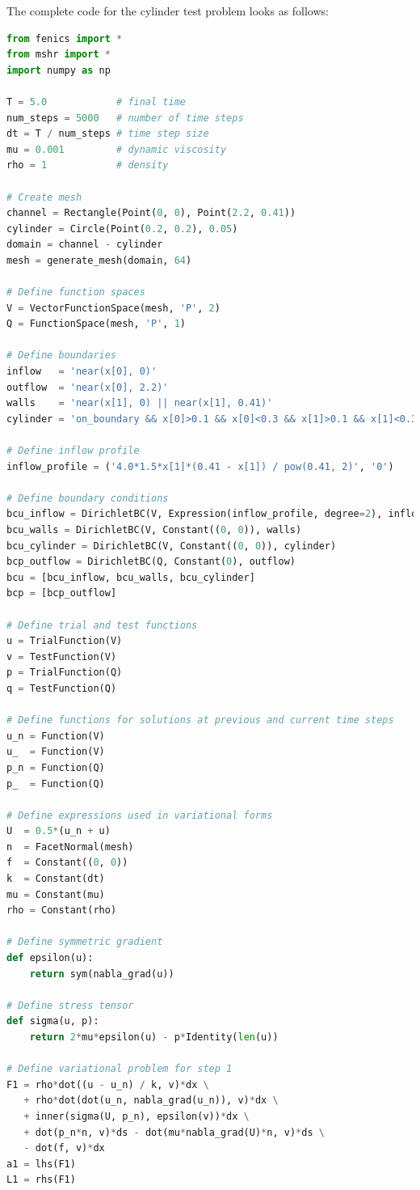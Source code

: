 \documentclass[graybox,envcountchap,sectrefs,final]{svmonodo}
\begin{document}
The complete code for the cylinder test problem looks as
follows:

\begin{lstlisting}[language=Python,style=graycolor]
from fenics import *
from mshr import *
import numpy as np

T = 5.0            # final time
num_steps = 5000   # number of time steps
dt = T / num_steps # time step size
mu = 0.001         # dynamic viscosity
rho = 1            # density

# Create mesh
channel = Rectangle(Point(0, 0), Point(2.2, 0.41))
cylinder = Circle(Point(0.2, 0.2), 0.05)
domain = channel - cylinder
mesh = generate_mesh(domain, 64)

# Define function spaces
V = VectorFunctionSpace(mesh, 'P', 2)
Q = FunctionSpace(mesh, 'P', 1)

# Define boundaries
inflow   = 'near(x[0], 0)'
outflow  = 'near(x[0], 2.2)'
walls    = 'near(x[1], 0) || near(x[1], 0.41)'
cylinder = 'on_boundary && x[0]>0.1 && x[0]<0.3 && x[1]>0.1 && x[1]<0.3'

# Define inflow profile
inflow_profile = ('4.0*1.5*x[1]*(0.41 - x[1]) / pow(0.41, 2)', '0')

# Define boundary conditions
bcu_inflow = DirichletBC(V, Expression(inflow_profile, degree=2), inflow)
bcu_walls = DirichletBC(V, Constant((0, 0)), walls)
bcu_cylinder = DirichletBC(V, Constant((0, 0)), cylinder)
bcp_outflow = DirichletBC(Q, Constant(0), outflow)
bcu = [bcu_inflow, bcu_walls, bcu_cylinder]
bcp = [bcp_outflow]

# Define trial and test functions
u = TrialFunction(V)
v = TestFunction(V)
p = TrialFunction(Q)
q = TestFunction(Q)

# Define functions for solutions at previous and current time steps
u_n = Function(V)
u_  = Function(V)
p_n = Function(Q)
p_  = Function(Q)

# Define expressions used in variational forms
U  = 0.5*(u_n + u)
n  = FacetNormal(mesh)
f  = Constant((0, 0))
k  = Constant(dt)
mu = Constant(mu)
rho = Constant(rho)

# Define symmetric gradient
def epsilon(u):
    return sym(nabla_grad(u))

# Define stress tensor
def sigma(u, p):
    return 2*mu*epsilon(u) - p*Identity(len(u))

# Define variational problem for step 1
F1 = rho*dot((u - u_n) / k, v)*dx \
   + rho*dot(dot(u_n, nabla_grad(u_n)), v)*dx \
   + inner(sigma(U, p_n), epsilon(v))*dx \
   + dot(p_n*n, v)*ds - dot(mu*nabla_grad(U)*n, v)*ds \
   - dot(f, v)*dx
a1 = lhs(F1)
L1 = rhs(F1)


\end{lstlisting}
\end{document}
